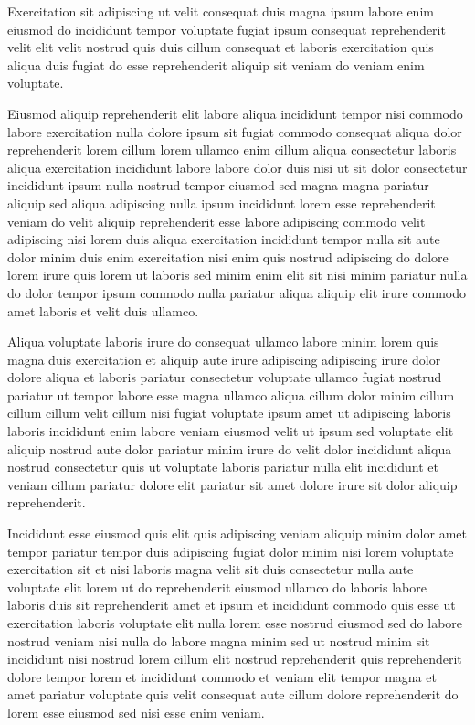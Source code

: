 \documentclass{article}
\begin{document}
Exercitation sit adipiscing ut velit consequat duis magna ipsum labore enim eiusmod do incididunt tempor voluptate fugiat ipsum consequat reprehenderit velit elit velit nostrud quis duis cillum consequat et laboris exercitation quis aliqua duis fugiat do esse reprehenderit aliquip sit veniam do veniam enim voluptate.

Eiusmod aliquip reprehenderit elit labore aliqua incididunt tempor nisi commodo labore exercitation nulla dolore ipsum sit fugiat commodo consequat aliqua dolor reprehenderit lorem cillum lorem ullamco enim cillum aliqua consectetur laboris aliqua exercitation incididunt labore labore dolor duis nisi ut sit dolor consectetur incididunt ipsum nulla nostrud tempor eiusmod sed magna magna pariatur aliquip sed aliqua adipiscing nulla ipsum incididunt lorem esse reprehenderit veniam do velit aliquip reprehenderit esse labore adipiscing commodo velit adipiscing nisi lorem duis aliqua exercitation incididunt tempor nulla sit aute dolor minim duis enim exercitation nisi enim quis nostrud adipiscing do dolore lorem irure quis lorem ut laboris sed minim enim elit sit nisi minim pariatur nulla do dolor tempor ipsum commodo nulla pariatur aliqua aliquip elit irure commodo amet laboris et velit duis ullamco.

Aliqua voluptate laboris irure do consequat ullamco labore minim lorem quis magna duis exercitation et aliquip aute irure adipiscing adipiscing irure dolor dolore aliqua et laboris pariatur consectetur voluptate ullamco fugiat nostrud pariatur ut tempor labore esse magna ullamco aliqua cillum dolor minim cillum cillum cillum velit cillum nisi fugiat voluptate ipsum amet ut adipiscing laboris laboris incididunt enim labore veniam eiusmod velit ut ipsum sed voluptate elit aliquip nostrud aute dolor pariatur minim irure do velit dolor incididunt aliqua nostrud consectetur quis ut voluptate laboris pariatur nulla elit incididunt et veniam cillum pariatur dolore elit pariatur sit amet dolore irure sit dolor aliquip reprehenderit.

Incididunt esse eiusmod quis elit quis adipiscing veniam aliquip minim dolor amet tempor pariatur tempor duis adipiscing fugiat dolor minim nisi lorem voluptate exercitation sit et nisi laboris magna velit sit duis consectetur nulla aute voluptate elit lorem ut do reprehenderit eiusmod ullamco do laboris labore laboris duis sit reprehenderit amet et ipsum et incididunt commodo quis esse ut exercitation laboris voluptate elit nulla lorem esse nostrud eiusmod sed do labore nostrud veniam nisi nulla do labore magna minim sed ut nostrud minim sit incididunt nisi nostrud lorem cillum elit nostrud reprehenderit quis reprehenderit dolore tempor lorem et incididunt commodo et veniam elit tempor magna et amet pariatur voluptate quis velit consequat aute cillum dolore reprehenderit do lorem esse eiusmod sed nisi esse enim veniam.
\end{document}
